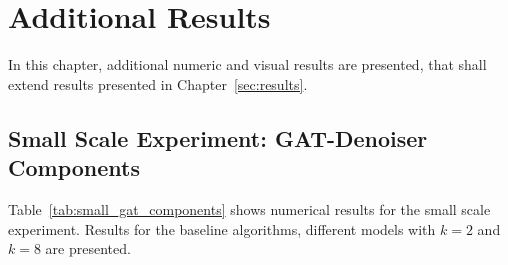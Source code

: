 
\chapter{Additional Results}
In this chapter, additional numeric and visual results are presented, that shall
extend results presented in Chapter~\ref{sec:results}.

\section{Small Scale Experiment: GAT-Denoiser Components}

Table~\ref{tab:small_gat_components} shows numerical results for the small scale experiment.
Results for the baseline algorithms, different models with $k=2$ and $k=8$ are presented.  
